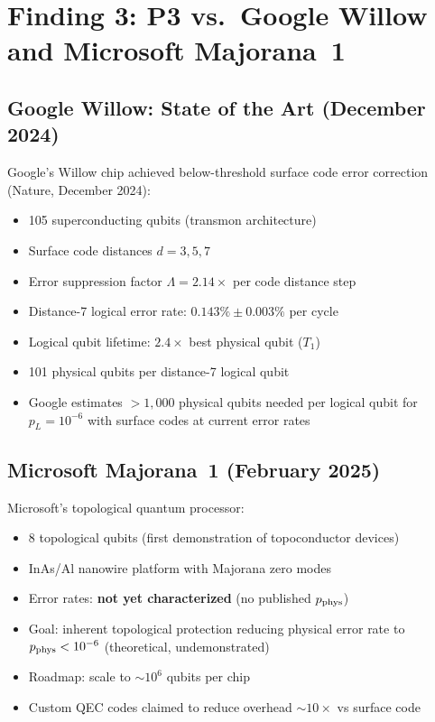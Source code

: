 \documentclass[11pt]{article}
\theoremstyle{definition}
\theoremstyle{remark}
\begin{document}
\section{Finding 3: P3 vs.\ Google Willow and Microsoft Majorana~1}
\label{sec:benchmarking}

\subsection{Google Willow: State of the Art (December 2024)}

Google's Willow chip achieved below-threshold surface code error correction
(Nature, December 2024):
\begin{itemize}
  \item 105 superconducting qubits (transmon architecture)
  \item Surface code distances $d = 3, 5, 7$
  \item Error suppression factor $\Lambda = 2.14\times$ per code distance step
  \item Distance-7 logical error rate: $0.143\% \pm 0.003\%$ per cycle
  \item Logical qubit lifetime: $2.4\times$ best physical qubit ($T_1$)
  \item 101 physical qubits per distance-7 logical qubit
  \item Google estimates $>1,000$ physical qubits needed per logical qubit
    for $p_L = 10^{-6}$ with surface codes at current error rates
\end{itemize}

\subsection{Microsoft Majorana~1 (February 2025)}

Microsoft's topological quantum processor:
\begin{itemize}
  \item 8 topological qubits (first demonstration of topoconductor devices)
  \item InAs/Al nanowire platform with Majorana zero modes
  \item Error rates: \textbf{not yet characterized} (no published $p_{\rm phys}$)
  \item Goal: inherent topological protection reducing physical error rate to
    $p_{\rm phys} < 10^{-6}$ (theoretical, undemonstrated)
  \item Roadmap: scale to $\sim 10^6$ qubits per chip
  \item Custom QEC codes claimed to reduce overhead $\sim 10\times$ vs surface code
\end{itemize}
\end{document}
